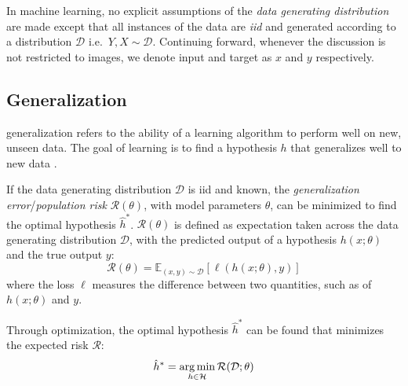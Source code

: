 In machine learning, no explicit assumptions  of the \textit{data generating distribution} are made except that all instances of the data are \textit{\gls{iid}} and generated according to a distribution $\mathcal{D}$ i.e.\ $Y, X \sim \mathcal{D}$. Continuing forward, whenever the discussion is not restricted to images, we denote input and target as $x$ and $y$ respectively. 

\subsection{Generalization}\label{sec:generalization}
\Gls{generalization} refers to the ability of a learning algorithm to perform well on new, unseen data. The goal of learning is to find a hypothesis $h$ that generalizes well to new data \cite{shalev-shwartzUnderstandingMachineLearning2014a}.

If the data generating distribution $\mathcal{D}$ is \gls{iid} and known, the \textit{generalization error}/\textit{population risk} $\mathcal{R}(\theta)$, with model parameters $\theta$, can be minimized to find the optimal hypothesis $\hat{h}^*$. $\mathcal{R}(\theta)$ is defined as expectation taken across the data generating distribution $\mathcal{D}$, with the predicted output of a hypothesis $h(x; \theta)$ and the true output $y$:
\begin{equation}\label{eq:risk}
    \mathcal{R}(\theta) = \mathbb{E}_{(x, y) \sim \mathcal{D}} \left[ \ell(h(x; \theta), y) \right]
\end{equation}
where the loss $\ell$ measures the difference between two quantities, such as of $h(x; \theta)$ and $y$.

Through optimization, the optimal hypothesis $\hat{h}^*$  can be found that minimizes the expected risk $\mathcal{R}$:
\begin{equation}\label{eq:risk-min}
    \hat{h}^* = \operatorname*{arg\,min}_{h \in \mathcal{H}} \mathcal{R}(\mathcal{D}; \theta)
\end{equation}


